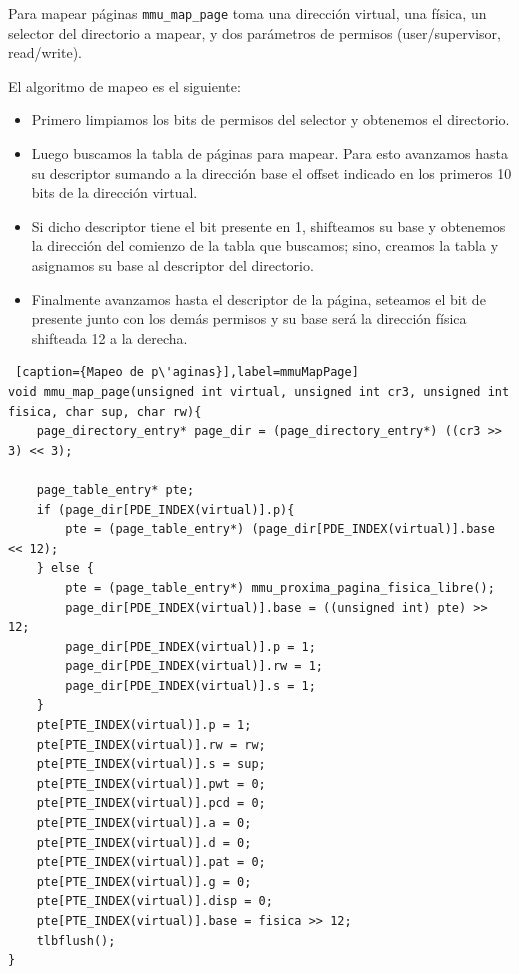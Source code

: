 \par Para mapear p\'aginas \texttt{mmu_map_page} toma una direcci\'on virtual, una f\'isica, un selector del directorio a mapear, y dos par\'ametros de permisos (user/supervisor, read/write).

\par El algoritmo de mapeo es el siguiente:

\begin{itemize}
\item Primero limpiamos los bits de permisos del selector y obtenemos el directorio.
\item  Luego buscamos la tabla de p\'aginas para mapear. Para esto avanzamos hasta su descriptor sumando a la direcci\'on base el offset indicado en los primeros 10 bits de la direcci\'on virtual.
\item Si dicho descriptor tiene el bit presente en 1, shifteamos su base y obtenemos la direcci\'on del comienzo de la tabla que buscamos; sino, creamos la tabla y asignamos su base al descriptor del directorio.
\item Finalmente avanzamos hasta el descriptor de la p\'agina, seteamos el bit de presente junto con los dem\'as permisos y su base ser\'a la direcci\'on f\'isica shifteada 12 a la derecha.
\end{itemize}

\begin{lstlisting} [caption={Mapeo de p\'aginas}],label=mmuMapPage] 
void mmu_map_page(unsigned int virtual, unsigned int cr3, unsigned int fisica, char sup, char rw){
	page_directory_entry* page_dir = (page_directory_entry*) ((cr3 >> 3) << 3);

	page_table_entry* pte;
	if (page_dir[PDE_INDEX(virtual)].p){
		pte = (page_table_entry*) (page_dir[PDE_INDEX(virtual)].base << 12);
	} else {
		pte = (page_table_entry*) mmu_proxima_pagina_fisica_libre();
		page_dir[PDE_INDEX(virtual)].base = ((unsigned int) pte) >> 12;
		page_dir[PDE_INDEX(virtual)].p = 1;
		page_dir[PDE_INDEX(virtual)].rw = 1;
		page_dir[PDE_INDEX(virtual)].s = 1;
	}
	pte[PTE_INDEX(virtual)].p = 1;
	pte[PTE_INDEX(virtual)].rw = rw;
	pte[PTE_INDEX(virtual)].s = sup;
	pte[PTE_INDEX(virtual)].pwt = 0;
	pte[PTE_INDEX(virtual)].pcd = 0;
	pte[PTE_INDEX(virtual)].a = 0;
	pte[PTE_INDEX(virtual)].d = 0;
	pte[PTE_INDEX(virtual)].pat = 0;
	pte[PTE_INDEX(virtual)].g = 0;
	pte[PTE_INDEX(virtual)].disp = 0;
	pte[PTE_INDEX(virtual)].base = fisica >> 12;		
	tlbflush();
}
\end{lstlisting}

